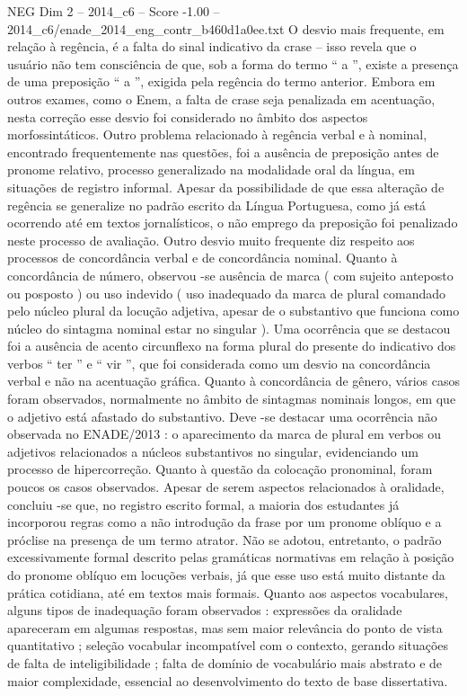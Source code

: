 \begin{textsample}{NEG Dim 2 – 2014\_c6 – Score -1.00 – 2014\_c6/enade\_2014\_eng\_contr\_b460d1a0ee.txt}
O desvio mais frequente, em relação à regência, é a falta do sinal indicativo da crase – isso revela que o usuário não tem consciência de que, sob a forma do termo “ a ”, existe a presença de uma preposição “ a ”, exigida pela regência do termo anterior.
Embora em outros exames, como o Enem, a falta de crase seja penalizada em acentuação, nesta correção esse desvio foi considerado no âmbito dos aspectos morfossintáticos.
Outro problema relacionado à regência verbal e à nominal, encontrado frequentemente nas questões, foi a ausência de preposição antes de pronome relativo, processo generalizado na modalidade oral da língua, em situações de registro informal.
Apesar da possibilidade de que essa alteração de regência se generalize no padrão escrito da Língua Portuguesa, como já está ocorrendo até em textos jornalísticos, o não emprego da preposição foi penalizado neste processo de avaliação.
Outro desvio muito frequente diz respeito aos processos de concordância verbal e de concordância nominal.
Quanto à concordância de número, observou -se ausência de marca ( com sujeito anteposto ou posposto ) ou uso indevido ( uso inadequado da marca de plural comandado pelo núcleo plural da locução adjetiva, apesar de o substantivo que funciona como núcleo do sintagma nominal estar no singular ).
Uma ocorrência que se destacou foi a ausência de acento circunflexo na forma plural do presente do indicativo dos verbos “ ter ” e “ vir ”, que foi considerada como um desvio na concordância verbal e não na acentuação gráfica.
Quanto à concordância de gênero, vários casos foram observados, normalmente no âmbito de sintagmas nominais longos, em que o adjetivo está afastado do substantivo.
Deve -se destacar uma ocorrência não observada no ENADE/2013 : o aparecimento da marca de plural em verbos ou adjetivos relacionados a núcleos substantivos no singular, evidenciando um processo de hipercorreção.
Quanto à questão da colocação pronominal, foram poucos os casos observados.
Apesar de serem aspectos relacionados à oralidade, concluiu -se que, no registro escrito formal, a maioria dos estudantes já incorporou regras como a não introdução da frase por um pronome oblíquo e a próclise na presença de um termo atrator.
Não se adotou, entretanto, o padrão excessivamente formal descrito pelas gramáticas normativas em relação à posição do pronome oblíquo em locuções verbais, já que esse uso está muito distante da prática cotidiana, até em textos mais formais.
Quanto aos aspectos vocabulares, alguns tipos de inadequação foram observados : expressões da oralidade apareceram em algumas respostas, mas sem maior relevância do ponto de vista quantitativo ; seleção vocabular incompatível com o contexto, gerando situações de falta de inteligibilidade ; falta de domínio de vocabulário mais abstrato e de maior complexidade, essencial ao desenvolvimento do texto de base dissertativa.

\end{textsample}
